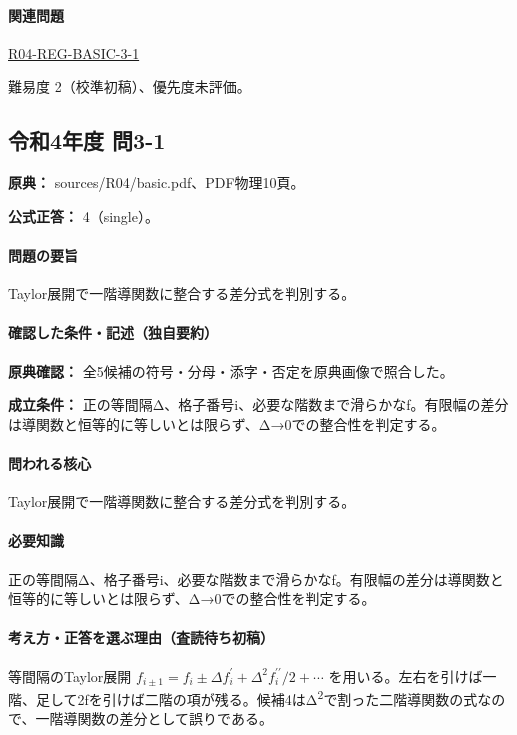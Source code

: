 \paragraph{関連問題} \hyperref[q:r04-reg-basic-3-1]{R04-REG-BASIC-3-1}

\par 難易度 2（校準初稿）、優先度未評価。

\subsection{令和4年度 問3-1}
\label{q:r04-reg-basic-3-1}

\noindent\textbf{原典：} sources/R04/basic.pdf、PDF物理10頁。

\textbf{公式正答：} 4（single）。

\paragraph{問題の要旨} Taylor展開で一階導関数に整合する差分式を判別する。

\paragraph{確認した条件・記述（独自要約）}\mbox{}\par

\noindent\textbf{原典確認：} 全5候補の符号・分母・添字・否定を原典画像で照合した。\par

\noindent\textbf{成立条件：} 正の等間隔Δ、格子番号i、必要な階数まで滑らかなf。有限幅の差分は導関数と恒等的に等しいとは限らず、Δ→0での整合性を判定する。\par

\paragraph{問われる核心} Taylor展開で一階導関数に整合する差分式を判別する。

\paragraph{必要知識} 正の等間隔Δ、格子番号i、必要な階数まで滑らかなf。有限幅の差分は導関数と恒等的に等しいとは限らず、Δ→0での整合性を判定する。

\paragraph{考え方・正答を選ぶ理由（査読待ち初稿）} 等間隔のTaylor展開 \(f_{i\pm1}=f_i\pm\Delta f_i^\prime+\Delta^2f_i^{\prime\prime}/2+\cdots\) を用いる。左右を引けば一階、足して2fを引けば二階の項が残る。候補4はΔ\textsuperscript{2}で割った二階導関数の式なので、一階導関数の差分として誤りである。

